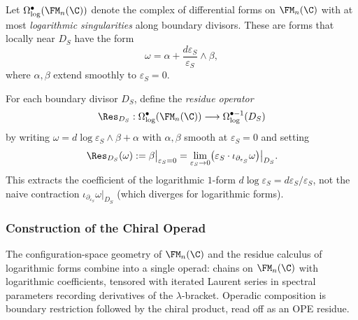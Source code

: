 \begin{definition}
Let $\Omega^\bullet_{\log}(\FM_n(\C))$ denote the complex of differential forms on $\FM_n(\C)$ with at most \emph{logarithmic singularities} along boundary divisors. These are forms that locally near $D_S$ have the form
\[
\omega = \alpha + \frac{d\varepsilon_S}{\varepsilon_S} \wedge \beta,
\]
where $\alpha, \beta$ extend smoothly to $\varepsilon_S = 0$.
\end{definition}


\begin{definition}
\label{def:residue_operator}
For each boundary divisor $D_S$, define the \emph{residue operator}
\[
\Res_{D_S} : \Omega^\bullet_{\log}(\FM_n(\C)) \longrightarrow \Omega^{\bullet-1}_{\log}(D_S)
\]
by writing $\omega = d\log\varepsilon_S \wedge \beta + \alpha$ with $\alpha, \beta$ smooth at $\varepsilon_S = 0$ and setting
\[
\Res_{D_S}(\omega) := \beta\big|_{\varepsilon_S = 0} = \lim_{\varepsilon_S \to 0}\bigl(\varepsilon_S \cdot \iota_{\partial_{\varepsilon_S}} \omega\bigr)\big|_{D_S}.
\]
This extracts the coefficient of the logarithmic $1$-form $d\log\varepsilon_S = d\varepsilon_S/\varepsilon_S$, not the naive contraction $\iota_{\partial_{\varepsilon_S}}\omega|_{D_S}$ (which diverges for logarithmic forms).
\end{definition}


\subsubsection{Construction of the Chiral Operad}

The configuration-space geometry of $\FM_n(\C)$ and the residue
calculus of logarithmic forms combine into a single operad: chains
on $\FM_n(\C)$ with logarithmic coefficients, tensored with iterated
Laurent series in spectral parameters recording derivatives of the
$\lambda$-bracket. Operadic composition is boundary restriction
followed by the chiral product, read off as an OPE residue.

